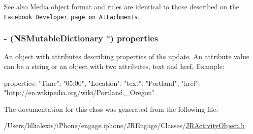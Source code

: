\begin{DoxySeeAlso}{See also}
Media object format and rules are identical to those described on the \href{http://developers.facebook.com/docs/guides/attachments}{\tt Facebook Developer page on Attachments}. 
\end{DoxySeeAlso}
\hypertarget{interface_j_r_activity_object_a1acf84854d275510685a1f2066061c4e}{
\subsubsection[{properties}]{\setlength{\rightskip}{0pt plus 5cm}-\/ (NSMutableDictionary $\ast$) properties}}
\label{interface_j_r_activity_object_a1acf84854d275510685a1f2066061c4e}
An object with attributes describing properties of the update. An attribute value can be a string or an object with two attributes, text and href. Example: 
\begin{DoxyCode}
   properties: 
   {
       "Time": "05:00",
       "Location": 
       {
           "text": "Portland",
           "href": "http://en.wikipedia.org/wiki/Portland,_Oregon"
       }
   }
\end{DoxyCode}
 

The documentation for this class was generated from the following file:\begin{DoxyCompactItemize}
\item 
/Users/lillialexis/iPhone/engage.iphone/JREngage/Classes/\hyperlink{_j_r_activity_object_8h}{JRActivityObject.h}\end{DoxyCompactItemize}
